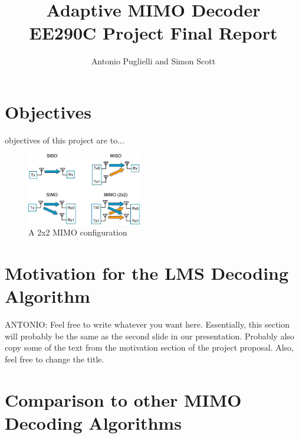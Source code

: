 \documentclass[journal]{IEEEtran}
\begin{document}
\title{Adaptive MIMO Decoder \\ {\Large EE290C Project Final Report}}

%

\author{Antonio Puglielli and Simon Scott}


\maketitle

\section{Objectives}

 objectives of this project are to...

\begin{figure}[!h]
\centering
\includegraphics*[width=5cm, viewport = 300 0 560 130]{images/agilent_mimo.jpg}
\caption{A 2x2 MIMO configuration}
\label{mimo_cartoon}
\end{figure}


\section{Motivation for the LMS Decoding Algorithm}

ANTONIO:
Feel free to write whatever you want here. Essentially, this section will probably be the same as the second slide in our presentation.
Probably also copy some of the text from the motivation section of the project proposal.
Also, feel free to change the title.


\section{Comparison to other MIMO Decoding Algorithms}
\end{document}
